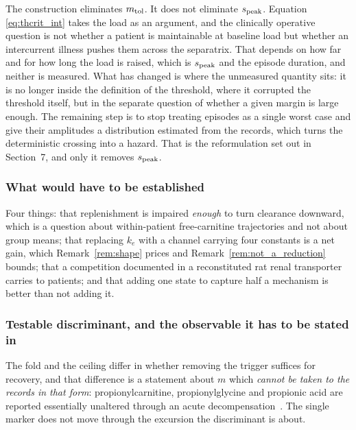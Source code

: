 \begin{remark}
\label{rem:intrinsic_limit}
The construction eliminates $m_{\mathrm{tol}}$. It does not eliminate $s_{\mathrm{peak}}$. Equation
\eqref{eq:thcrit_int} takes the load as an argument, and the clinically operative question
is not whether a patient is maintainable at baseline load but whether an intercurrent
illness pushes them across the separatrix. That depends on how far and for how long the
load is raised, which is $s_{\mathrm{peak}}$ and the episode duration, and neither is measured. What has
changed is where the unmeasured quantity sits: it is no longer inside the definition of the
threshold, where it corrupted the threshold itself, but in the separate question of whether
a given margin is large enough. The remaining step is to stop treating episodes as a single
worst case and give their amplitudes a distribution estimated from the records, which turns
the deterministic crossing into a hazard. That is the reformulation set out in Section~7,
and only it removes $s_{\mathrm{peak}}$.
\end{remark}

\subsubsection{What would have to be established}
\label{sec:notworking}

Four things: that replenishment is impaired \emph{enough}
to turn clearance downward, which is a question about within-patient free-carnitine
trajectories and not about group means; that replacing $k_e$ with a channel carrying four
constants is a net gain, which Remark~\ref{rem:shape} prices and
Remark~\ref{rem:not_a_reduction} bounds; that a competition documented in a reconstituted
rat renal transporter carries to patients; and that adding one state to capture half a
mechanism is better than not adding it.

\subsubsection{Testable discriminant, and the observable it has to be stated in}
\label{sec:discriminant}

The fold and the ceiling differ in whether removing the trigger suffices for recovery, and
that difference is a statement about $m$ which \emph{cannot be taken to the records in that
form}: propionylcarnitine, propionylglycine and propionic acid are reported essentially
unaltered through an acute decompensation~\cite{amd_phenotyping}. %
The single marker does not move through the excursion the discriminant is about.

